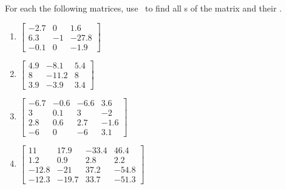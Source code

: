 \begin{exercise} \label{ex:} 
For each the following matrices, use \script\ to find all s of the matrix and their .

\begin{enumerate}
\item \(\begin{bmatrix} -2.7 & 0 & 1.6
\\6.3 & -1 & -27.8
\\-0.1 & 0 & -1.9 \end{bmatrix}\)
\setbox\ajrqrbox\hbox{}%
\marginpar{\usebox{\ajrqrbox}}%

\item \(\begin{bmatrix} 4.9 & -8.1 & 5.4
\\8 & -11.2 & 8
\\3.9 & -3.9 & 3.4 \end{bmatrix}\)
\setbox\ajrqrbox\hbox{}%
\marginpar{\usebox{\ajrqrbox}}%

\item \(\begin{bmatrix} -6.7 & -0.6 & -6.6 & 3.6
\\3 & 0.1 & 3 & -2
\\2.8 & 0.6 & 2.7 & -1.6
\\-6 & 0 & -6 & 3.1 \end{bmatrix}\)
\setbox\ajrqrbox\hbox{}%
\marginpar{\usebox{\ajrqrbox}}%

\item \(\begin{bmatrix} 11 & 17.9 & -33.4 & 46.4
\\1.2 & 0.9 & 2.8 & 2.2
\\-12.8 & -21 & 37.2 & -54.8
\\-12.3 & -19.7 & 33.7 & -51.3 \end{bmatrix}\)
\setbox\ajrqrbox\hbox{}%
\marginpar{\usebox{\ajrqrbox}}%


\end{enumerate}
\end{exercise}
